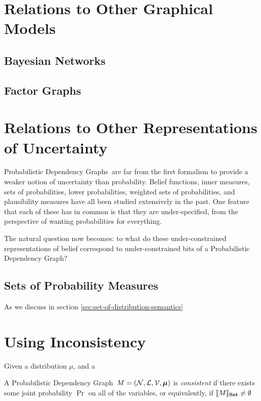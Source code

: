 \documentclass{article}
\newcommand{\modelname}{Probabilistic Dependency Graph}
\newcommand{\modelnames}{Probabilistic Dependency Graphs}
\newcommand\Set{\textbf{Set}}
\newcommand\bmu{\boldsymbol{\mu}}
\begin{document}
	

	
	\section{Relations to Other Graphical Models}
	\subsection{Bayesian Networks}
	\subsection{Factor Graphs}

	\section{Relations to Other Representations of Uncertainty}
	\modelnames\ are far from the first formalism to provide a weaker notion of uncertainty than probability. Belief functions, inner measures, sets of probabilities, lower probabilities, weighted sets of probabilities, and plausibility measures have all been studied extensively in the past. One feature that each of these has in common is that they are under-specified, from the perspective of wanting probabilities for everything.

	The natural question now becomes: to what do these under-constrained representations of belief correspond to under-constrained bits of a \modelname?

	\subsection{Sets of Probability Measures}
	As we discuss in section \ref{sec:set-of-distribution-semantics}



	\section{Using Inconsistency}

	Given a distribution $\mu$, and a
	
	\begin{defn}[consistency]
		A \modelname\ $M = ({\cal N, L, V}, \bmu)$ is \emph{consistent} if there exists some joint probability $\Pr$ on all of the variables, or equivalently, if $\bbr{M}_\Set \neq \emptyset$
	\end{defn}
\end{document}
